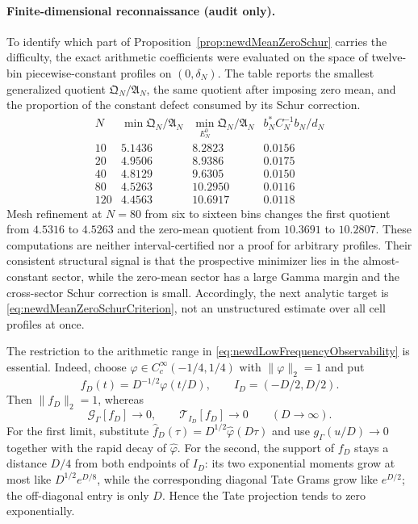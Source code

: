 \documentclass[11pt]{amsart}
\theoremstyle{definition}
\theoremstyle{remark}
\begin{document}
\paragraph{Finite-dimensional reconnaissance (audit only).}
To identify which part of Proposition~\ref{prop:newdMeanZeroSchur} carries
the difficulty, the exact arithmetic coefficients were evaluated on the
space of twelve-bin piecewise-constant profiles on $(0,\delta_N)$.  The
table reports the smallest generalized quotient
$\mathfrak Q_N/\mathfrak A_N$, the same quotient after imposing zero mean,
and the proportion of the constant defect consumed by its Schur correction.
\[
\begin{array}{c|c|c|c}
N&\min \mathfrak Q_N/\mathfrak A_N&
\min_{E_N^0}\mathfrak Q_N/\mathfrak A_N&
b_N^*C_N^{-1}b_N/d_N\\ \hline
10 &5.1436&8.2823&0.0156\\
20 &4.9506&8.9386&0.0175\\
40 &4.8129&9.6305&0.0150\\
80 &4.5263&10.2950&0.0116\\
120&4.4563&10.6917&0.0118
\end{array}
\]
Mesh refinement at $N=80$ from six to sixteen bins changes the first
quotient from $4.5316$ to $4.5263$ and the zero-mean quotient from
$10.3691$ to $10.2807$.  These computations are neither interval-certified
nor a proof for arbitrary profiles.  Their consistent structural signal is
that the prospective minimizer lies in the almost-constant sector, while
the zero-mean sector has a large Gamma margin and the cross-sector Schur
correction is small.  Accordingly, the next analytic target is
\eqref{eq:newdMeanZeroSchurCriterion}, not an unstructured estimate over
all cell profiles at once.

The restriction to the arithmetic range in
\eqref{eq:newdLowFrequencyObservability} is essential.  Indeed, choose
$\varphi\in C_c^\infty(-1/4,1/4)$ with $\|\varphi\|_2=1$ and put
\begin{equation}\label{eq:newdPlateauFamily}
 f_D(t)=D^{-1/2}\varphi(t/D),
 \qquad I_D=(-D/2,D/2).
\end{equation}
Then $\|f_D\|_2=1$, whereas
\begin{equation}\label{eq:newdPlateauEscape}
 \mathcal G_\Gamma[f_D]\longrightarrow0,
 \qquad
 \mathcal T_{I_D}[f_D]\longrightarrow0
 \qquad(D\to\infty).
\end{equation}
For the first limit, substitute
$\widehat f_D(\tau)=D^{1/2}\widehat\varphi(D\tau)$ and use
$g_\Gamma(u/D)\to0$ together with the rapid decay of
$\widehat\varphi$.  For the second, the support of $f_D$ stays a distance
$D/4$ from both endpoints of $I_D$: its two exponential moments grow at
most like $D^{1/2}e^{D/8}$, while the corresponding diagonal Tate Grams
grow like $e^{D/2}$; the off-diagonal entry is only $D$.  Hence the Tate
projection tends to zero exponentially.
\end{document}
